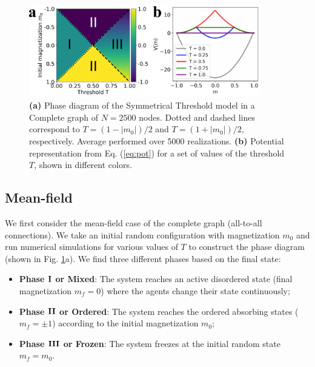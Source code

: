 \begin{figure}
	\centering \captionsetup{font=sf}
	\includegraphics[width=0.9\textwidth]{Figs/Aging_STM/FIG1.pdf}
	\caption[Phases of the Symmetrical Threshold model]{\textbf{(a)} Phase diagram of the Symmetrical Threshold model in a Complete graph of $N = 2500$ nodes. Dotted and dashed lines correspond to $T = (1-|m_0|)/2$ and $T = (1+|m_0|)/2$, respectively. Average performed over 5000 realizations. \textbf{(b)} Potential representation from Eq. (\ref{eq:pot}) for a set of values of the threshold $T$, shown in different colors.}
	\label{COM_LAT_PD}
\end{figure}

\subsection{Mean-field}

We first consider the mean-field case of the complete graph (all-to-all connections). We take an initial random configuration with magnetization $m_0$ and run numerical simulations for various values of $T$ to construct the phase diagram (shown in Fig. \ref{COM_LAT_PD}a). We find three different phases based on the final state:

\begin{itemize}
	\item \textbf{Phase ${\rm {\bf I}}$ or Mixed}: The system reaches an active disordered state (final magnetization $m_f = 0$) where the agents change their state continuously;
	\item \textbf{Phase ${\rm {\bf II}}$ or Ordered}: The system reaches the ordered absorbing states ($m_f = \pm 1$) according to the initial magnetization $m_0$;
	\item \textbf{Phase ${\rm {\bf III}}$ or Frozen}: The system freezes at the initial random state $m_f = m_0$.
\end{itemize}

